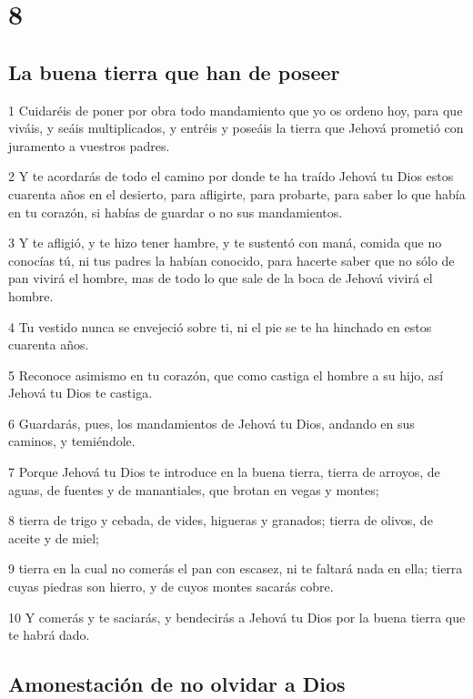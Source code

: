 \chapter{8}

\section{La buena tierra que han de poseer}

\par 1 Cuidaréis de poner por obra todo mandamiento que yo os ordeno hoy, para que viváis, y seáis multiplicados, y entréis y poseáis la tierra que Jehová prometió con juramento a vuestros padres.
\par 2 Y te acordarás de todo el camino por donde te ha traído Jehová tu Dios estos cuarenta años en el desierto, para afligirte, para probarte, para saber lo que había en tu corazón, si habías de guardar o no sus mandamientos.
\par 3 Y te afligió, y te hizo tener hambre, y te sustentó con maná, comida que no conocías tú, ni tus padres la habían conocido, para hacerte saber que no sólo de pan vivirá el hombre, mas de todo lo que sale de la boca de Jehová vivirá el hombre.
\par 4 Tu vestido nunca se envejeció sobre ti, ni el pie se te ha hinchado en estos cuarenta años.
\par 5 Reconoce asimismo en tu corazón, que como castiga el hombre a su hijo, así Jehová tu Dios te castiga.
\par 6 Guardarás, pues, los mandamientos de Jehová tu Dios, andando en sus caminos, y temiéndole.
\par 7 Porque Jehová tu Dios te introduce en la buena tierra, tierra de arroyos, de aguas, de fuentes y de manantiales, que brotan en vegas y montes;
\par 8 tierra de trigo y cebada, de vides, higueras y granados; tierra de olivos, de aceite y de miel;
\par 9 tierra en la cual no comerás el pan con escasez, ni te faltará nada en ella; tierra cuyas piedras son hierro, y de cuyos montes sacarás cobre.
\par 10 Y comerás y te saciarás, y bendecirás a Jehová tu Dios por la buena tierra que te habrá dado.

\section{Amonestación de no olvidar a Dios}

